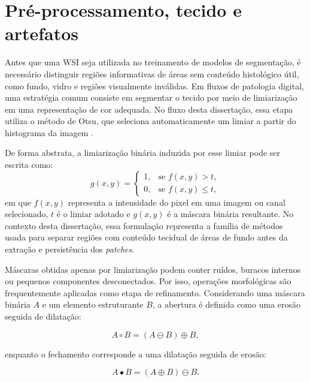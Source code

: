 \section{Pré-processamento, tecido e artefatos}\label{sec:preprocessamento_patologia}

Antes que uma WSI seja utilizada no treinamento de modelos de segmentação, é
necessário distinguir regiões informativas de áreas sem conteúdo histológico
útil, como fundo, vidro e regiões visualmente inválidas. Em fluxos de patologia
digital, uma estratégia comum consiste em segmentar o tecido por meio de
limiarização em uma representação de cor adequada. No fluxo desta dissertação,
essa etapa utiliza o método de Otsu, que seleciona automaticamente um limiar a
partir do histograma da imagem \cite{otsu1979threshold}.

De forma abstrata, a limiarização binária induzida por esse limiar pode ser
escrita como:
\begin{equation}\label{eq:otsu-threshold}
    g(x,y) =
    \begin{cases}
        1, & \text{se } f(x,y) > t,\\
        0, & \text{se } f(x,y) \leq t,
    \end{cases}
\end{equation}
em que $f(x,y)$ representa a intensidade do pixel em uma imagem ou canal
selecionado, $t$ é o limiar adotado e $g(x,y)$ é a máscara binária resultante.
No contexto desta dissertação, essa formulação representa a família de métodos
usada para separar regiões com conteúdo tecidual de áreas de fundo antes da
extração e persistência dos \textit{patches}.

Máscaras obtidas apenas por limiarização podem conter ruídos, buracos internos
ou pequenos componentes desconectados. Por isso, operações morfológicas são
frequentemente aplicadas como etapa de refinamento. Considerando uma máscara
binária $A$ e um elemento estruturante $B$, a abertura é definida como uma
erosão seguida de dilatação:

\begin{equation}\label{eq:morph-opening}
    A \circ B = (A \ominus B) \oplus B,
\end{equation}

enquanto o fechamento corresponde a uma dilatação seguida de erosão:

\begin{equation}\label{eq:morph-closing}
    A \bullet B = (A \oplus B) \ominus B.
\end{equation}

